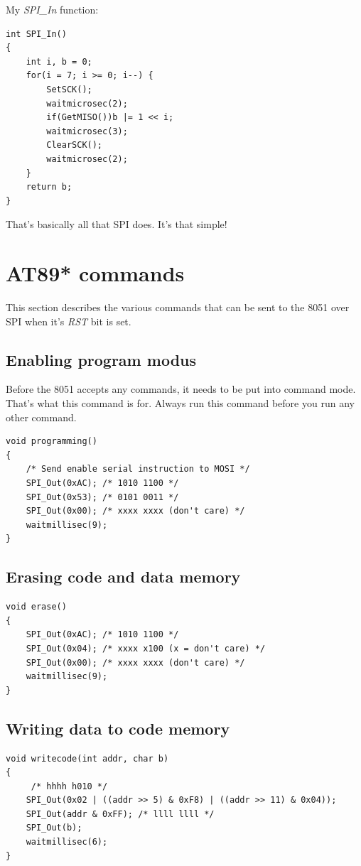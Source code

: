 \documentclass[a4paper]{article}
\begin{document}
My {\em SPI\_In} function:

\begin{lstlisting}
int SPI_In()
{
	int i, b = 0;
	for(i = 7; i >= 0; i--) {
		SetSCK();
		waitmicrosec(2);
		if(GetMISO())b |= 1 << i;
		waitmicrosec(3);
		ClearSCK();
		waitmicrosec(2);
	}
	return b;
}
\end{lstlisting}

That's basically all that SPI does. It's that simple!

\section{AT89* commands}

This section describes the various commands that can be sent 
to the 8051 over SPI when it's {\em RST} bit is set.

\subsection{Enabling program modus}

Before the 8051 accepts any commands, it needs to be put into command mode.
That's what this command is for. Always run this command before you 
run any other command.

\begin{lstlisting}
void programming()
{
	/* Send enable serial instruction to MOSI */
	SPI_Out(0xAC); /* 1010 1100 */
	SPI_Out(0x53); /* 0101 0011 */
	SPI_Out(0x00); /* xxxx xxxx (don't care) */
	waitmillisec(9);
}
\end{lstlisting}

\subsection{Erasing code and data memory}

\begin{lstlisting}
void erase()
{
	SPI_Out(0xAC); /* 1010 1100 */
	SPI_Out(0x04); /* xxxx x100 (x = don't care) */
	SPI_Out(0x00); /* xxxx xxxx (don't care) */
	waitmillisec(9);
}
\end{lstlisting}


\subsection{Writing data to code memory}

\begin{lstlisting}
void writecode(int addr, char b)
{
     /* hhhh h010 */
	SPI_Out(0x02 | ((addr >> 5) & 0xF8) | ((addr >> 11) & 0x04));
	SPI_Out(addr & 0xFF); /* llll llll */
	SPI_Out(b);
	waitmillisec(6);
}
\end{lstlisting}
\end{document}
